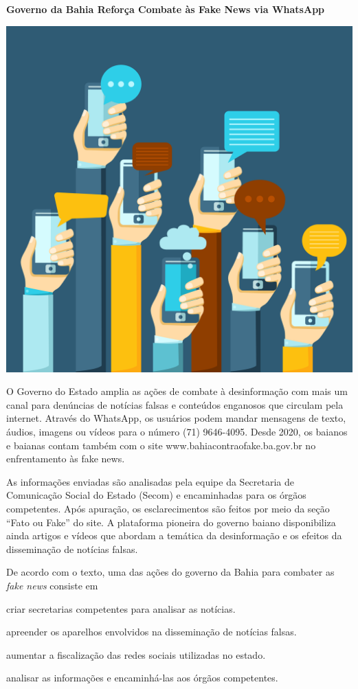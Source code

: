 \begin{myquote}
\textbf{Governo da Bahia Reforça Combate às Fake News via WhatsApp}

\begin{center}
\includegraphics[width=.4\textwidth]{media/image48a.jpeg}
\end{center}

O Governo do Estado amplia as ações de combate à desinformação com mais
um canal para denúncias de notícias falsas e conteúdos enganosos que
circulam pela internet. Através do WhatsApp, os usuários podem mandar
mensagens de texto, áudios, imagens ou vídeos para o número (71)
9646-4095. Desde 2020, os baianos e baianas contam também com o site
www.bahiacontraofake.ba.gov.br no enfrentamento às fake news.

As informações enviadas são analisadas pela equipe da Secretaria de
Comunicação Social do Estado (Secom) e encaminhadas para os órgãos
competentes. Após apuração, os esclarecimentos são feitos por meio da
seção ``Fato ou Fake'' do site. A plataforma pioneira do governo baiano
disponibiliza ainda artigos e vídeos que abordam a temática da
desinformação e os efeitos da disseminação de notícias falsas.

\end{myquote}

De acordo com o texto, uma das ações do governo da Bahia para combater
as \textit{fake news} consiste em

\begin{escolha}

  \item criar secretarias competentes para analisar as notícias.

  \item apreender os aparelhos envolvidos na disseminação de notícias
falsas.

  \item aumentar a fiscalização das redes sociais utilizadas no estado.

  \item analisar as informações e encaminhá-las aos órgãos competentes.
\end{escolha}


